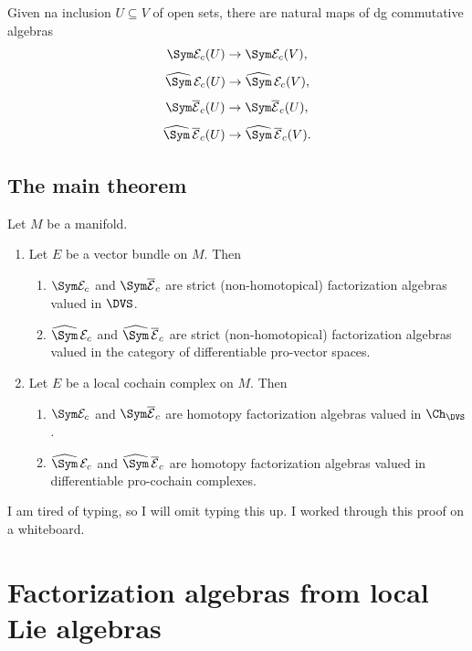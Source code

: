 Given na inclusion $U\subseteq V$ of open sets, there are natural maps of dg commutative algebras
\[
	\Sym \mathcal{E} _c(U)\to \Sym \mathcal{E} _c(V)
,\]
\[
	\widehat{\Sym }\,\mathcal{E} _c(U)\to \widehat{\Sym }\,\mathcal{E} _c(V)
,\]
\[
	\Sym \overline{\mathcal{E} } _c(U)\to \Sym \overline{\mathcal{E} } _c(U)
,\]
\[
	\widehat{\Sym }\,\overline{\mathcal{E} }_c(U)\to \widehat{\Sym }\,\overline{\mathcal{E} }_c(V)
.\]

\subsection{The main theorem}

\begin{theorem}\label{thm:6-5-3}
	Let $M$ be a manifold.
	\begin{enumerate}
		\item Let $E$ be a vector bundle on $M$. Then
			\begin{enumerate}
				\item $\Sym \mathcal{E} _c$ and $\Sym \overline{\mathcal{E} } _c$ are strict (non-homotopical) factorization algebras valued in $\DVS $.
				\item $\widehat{\Sym}\, \mathcal{E}_c$ and $\widehat{\Sym }\, \overline{\mathcal{E} }_c$ are strict (non-homotopical) factorization algebras valued in the category of differentiable pro-vector spaces.
			\end{enumerate}
		\item Let $E$ be a local cochain complex on $M$. Then
			\begin{enumerate}
				\item $\Sym \mathcal{E} _c$ and $\Sym \overline{\mathcal{E} } _c$ are homotopy factorization algebras valued in $\Ch_{\DVS } $.
				\item $\widehat{\Sym }\,\mathcal{E} _c$ and $\widehat{\Sym } \, \overline{\mathcal{E} } _c$ are homotopy factorization algebras valued in differentiable pro-cochain complexes.
			\end{enumerate}
	\end{enumerate}
\end{theorem}

I am tired of typing, so I will omit typing this up. I worked through this proof on a whiteboard.

\section{Factorization algebras from local Lie algebras}

